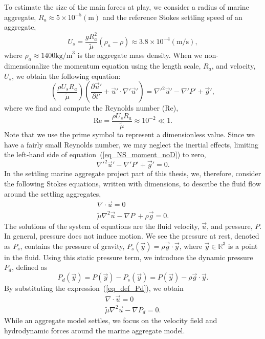 To estimate the size of the main forces at play, we consider a radius of marine aggregate, $R_a \approx 5 \times 10^{-5} (\text{m})$ and the reference Stokes settling speed of an aggregate,
\begin{equation}
    U_s =  \frac{gR_a^2}{{\tilde{\mu}}} (\rho_a-\rho) \approx 3.8 \times 10^{-4} ({\text{m/s}}),
	\label{eq_U_s}
\end{equation}
where $\rho_a \approx 1400\text{kg/m}^3$ is the aggregate mass density. 
When we non-dimensionalize the momentum equation using the length scale, $R_a$, and velocity, $U_s$, we obtain the following equation:
\begin{equation}
	\left(\frac{\rho U_s R_a}{{\tilde{\mu}}} \right) 
   \left( 
   \frac{\partial \vec{u}'}{\partial t'} + \vec{u}'\cdot \nabla' \vec{u}'
\right)
 = {\nabla'}^2 \vec{u}' - \nabla' P' +  \vec{g}',
 \label{eq_NS_moment_noD}
\end{equation}
where we find and compute the Reynolds number (Re),
\begin{equation}
	\text{Re} = \frac{\rho U_s R_a}{{\tilde{\mu}}} \approx 10^{-2}
	\ll 1.
   \label{eq_Re}
\end{equation}
Note that we use the prime symbol to represent a dimensionless value.
Since we have a fairly small Reynolds number, we may neglect the inertial effects, limiting the left-hand side of equation~(\ref{eq_NS_moment_noD}) to zero,
\begin{equation}
   {\nabla'}^2 \vec{u}' - \nabla' P' +  \vec{g}' = 0.
\end{equation}
In the settling marine aggregate project part of this thesis, we, therefore, consider the following Stokes equations, written with dimensions, to describe the fluid flow around the settling aggregates,
 \begin{align}
	\nabla \cdot \vec{u}  = 0  
	\nonumber \\
	{\tilde{\mu}} \nabla^2 \vec{u}    - \nabla P\ + \rho  \vec{g} = 0.
	\label{eq_stokes2}
\end{align}
The solutions of the system of equations are the fluid velocity, $\vec{u}$, and pressure, $P$. In general, pressure does not induce motion. We see the pressure at rest, denoted as $P_s$, contains the pressure of gravity,  $P_s(\vec{y}) = \rho \vec{g} \cdot \vec{y}$, where $\vec{y} \in \mathbb{R}^3$ is a point in the fluid. Using this static pressure term, we introduce the dynamic pressure $P_d$, defined as 
\begin{equation}
   P_d(\vec{y}) = P(\vec{y}) - P_s(\vec{y}) = P(\vec{y}) - \rho \vec{g} \cdot \vec{y}.
   \label{eq_def_Pd}
\end{equation}
By substituting the expression~(\ref{eq_def_Pd}), we obtain
\begin{align}
	\nabla \cdot \vec{u}  = 0  
	\nonumber \\
	{\tilde{\mu}} \nabla^2 \vec{u}    - \nabla P_d = 0.
	\label{eq_stokes3}
\end{align}
While an aggregate model settles, we focus on the velocity field and hydrodynamic forces around the marine aggregate model. 

